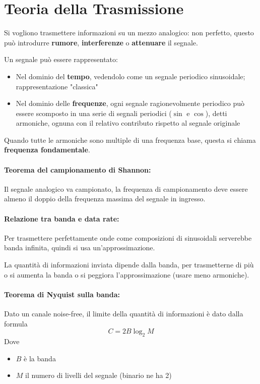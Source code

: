\section{Teoria della Trasmissione}

Si vogliono trasmettere informazioni su un mezzo analogico: non perfetto, questo può introdurre \textbf{rumore}, \textbf{interferenze} o \textbf{attenuare} il segnale.

Un segnale può essere rappresentato: 
\begin{itemize}
    \item Nel dominio del \textbf{tempo}, vedendolo come un segnale periodico sinusoidale; rappresentazione "classica"
    
    \item Nel dominio delle \textbf{frequenze}, ogni segnale ragionevolmente periodico può essere scomposto in una serie di segnali periodici ($\sin$ e $\cos$), detti armoniche, ognuna con il relativo contributo rispetto al segnale originale
\end{itemize}

Quando tutte le armoniche sono multiple di una frequenza base, questa si chiama \textbf{frequenza fondamentale}.

\paragraph{Teorema del campionamento di Shannon:} Il segnale analogico va campionato, la frequenza di campionamento deve essere almeno il doppio della frequenza massima del segnale in ingresso. 

\paragraph{Relazione tra banda e data rate:} Per trasmettere perfettamente onde come composizioni di sinusoidali serverebbe banda infinita, quindi si usa un'approssimazione.

La quantità di informazioni inviata dipende dalla banda, per trasmetterne di più o si aumenta la banda o si peggiora l'approssimazione (usare meno armoniche).

\paragraph{Teorema di Nyquist sulla banda:} Dato un canale noise-free, il limite della quantità di informazioni è dato dalla formula
$$ C = 2 B \log_2 M $$
Dove
\begin{itemize}
    \item $B$ è la banda
    \item $M$ il numero di livelli del segnale (binario ne ha 2)
\end{itemize}

